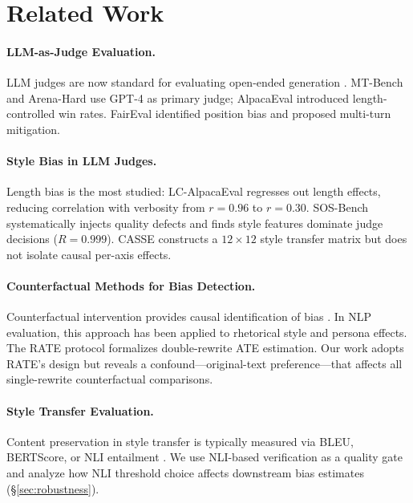 \documentclass[11pt,a4paper]{article}
\begin{document}
\section{Related Work}

\paragraph{LLM-as-Judge Evaluation.}
LLM judges are now standard for evaluating open-ended generation \citep{zheng2024chatbot,li2024alpacaeval}. MT-Bench \citep{zheng2024chatbot} and Arena-Hard \citep{arenahard2024} use GPT-4 as primary judge; AlpacaEval \citep{li2024alpacaeval} introduced length-controlled win rates. FairEval \citep{faireval2024} identified position bias and proposed multi-turn mitigation.

\paragraph{Style Bias in LLM Judges.}
Length bias is the most studied: LC-AlpacaEval \citep{dubois2024alpacaeval} regresses out length effects, reducing correlation with verbosity from $r=0.96$ to $r=0.30$. SOS-Bench \citep{sosbench2025} systematically injects quality defects and finds style features dominate judge decisions ($R=0.999$). CASSE \citep{casse2026} constructs a $12 \times 12$ style transfer matrix but does not isolate causal per-axis effects.

\paragraph{Counterfactual Methods for Bias Detection.}
Counterfactual intervention provides causal identification of bias \citep{veitch2020counterfactual}. In NLP evaluation, this approach has been applied to rhetorical style \citep{counterfactual_rhetorical2025} and persona effects. The RATE protocol \citep{rate2025} formalizes double-rewrite ATE estimation. Our work adopts RATE's design but reveals a confound---original-text preference---that affects all single-rewrite counterfactual comparisons.

\paragraph{Style Transfer Evaluation.}
Content preservation in style transfer is typically measured via BLEU, BERTScore, or NLI entailment \citep{mir2019evaluating,krishna2020reformulating}. We use NLI-based verification as a quality gate and analyze how NLI threshold choice affects downstream bias estimates (\S\ref{sec:robustness}).
\end{document}
